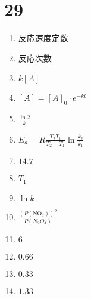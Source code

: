 \documentclass[dvipdfmx]{article}
\begin{document}
  \section*{29}
  \begin{enumerate}
    \item 反応速度定数
    \item 反応次数
    \item $k[A]$
    \item $[A] = [A]_0 \cdot e^{-kt}$
    \item $\frac{\ln 2}{k}$
    \item $E_a = R\frac{T_2 T_1}{T_2 - T_1} \ln \frac{k_2}{k_1}$
    \item $14.7$
    \item $T_1$
    \item $\ln k$
    \item $\frac{(P(\mathrm{NO_2}))^2}{P(N_2O_4)}$
    \item $6$
    \item $0.66$
    \item $0.33$
    \item $1.33$
  \end{enumerate}
\end{document}
